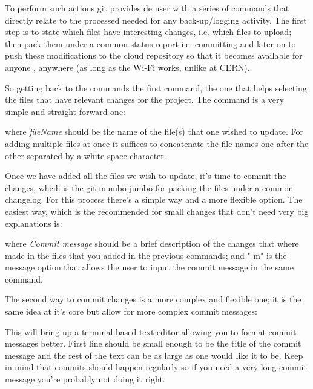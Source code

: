 \documentclass[runningheads,a4paper]{llncs}
\begin{document}
To perform such actions git provides de user with a series of commands that directly relate to the processed needed for any back-up/logging activity. The first step is to state which files have interesting changes, i.e. which files to upload; then pack them under a common status report i.e. committing and later on to push these modifications to the cloud repository so that it becomes available for anyone , anywhere (as long as the Wi-Fi works, unlike at CERN).

So getting back to the commands the first command, the one that helps selecting the files that have relevant changes for the project. The command is a very simple and straight forward one:\newline

\newline

where \textit{fileName} should be the name of the file(s) that one wished to update. For adding multiple files at once it suffices to concatenate the file names one after the other separated by a white-space character.

Once we have added all the files we wish to update, it's time to commit the changes, whcih is the git mumbo-jumbo for packing the files under a common changelog. For this process there's a simple way and a more flexible option. The easiest way, which is the recommended for small changes that don't need very big explanations is: \newline

\indent{\texttt{git commit -m [Commit message}}\newline

where \textit{Commit message} should be a brief description of the changes that where made in the files that you added in the previous commands; and "-m" is the message option that allows the user to input the commit message in the same command.

The second way to commit changes is a more complex and flexible one; it is the same idea at it's core but allow for more complex commit messages: \newline

\newline

This will bring up a terminal-based text editor allowing you to format commit messages better. First line should be small enough to be the title of the commit message and the rest of the text can be as large as one would like it to be. Keep in mind that commits should happen regularly so if you need a very long commit message you're probably not doing it right.
\end{document}
